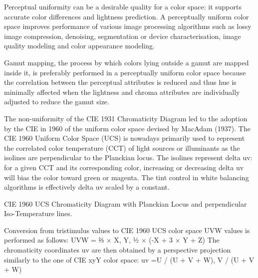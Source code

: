 
Perceptual uniformity can be a desirable quality for a color space: it supports accurate color differences and lightness prediction. A perceptually uniform color space improves performance of various image processing algorithms such as lossy image compression, denoising, segmentation or device characterisation, image quality modeling and color appearance modeling.

Gamut mapping, the process by which colors lying outside a gamut are mapped inside it, is preferably performed in a perceptually uniform color space because the correlation between the perceptual attributes is reduced and thus hue is minimally affected when the lightness and chroma attributes are individually adjusted to reduce the gamut size.

The non-uniformity of the CIE 1931 Chromaticity Diagram led to the adoption by the CIE in 1960 of the uniform color space devised by MacAdam (1937). The CIE 1960 Uniform Color Space (UCS) is nowadays primarily used to represent the correlated color temperature (CCT) of light sources or illuminants as the isolines are perpendicular to the Planckian locus. The isolines represent delta uv: for a given CCT and its corresponding color, increasing or decreasing delta uv will bias the color toward green or magenta. The tint control in white balancing algorithms is effectively delta uv scaled by a constant.

CIE 1960 UCS Chromaticity Diagram with Planckian Locus and perpendicular Iso-Temperature lines.

Conversion from tristimulus values to CIE 1960 UCS color space UVW values is performed as follows:
UVW = ⅔ × X, Y, ½ × (-X + 3 × Y + Z)
The chromaticity coordinates uv are then obtained by a perspective projection similarly to the one of CIE xyY color space:
uv =U / (U + V + W), V / (U + V + W)

